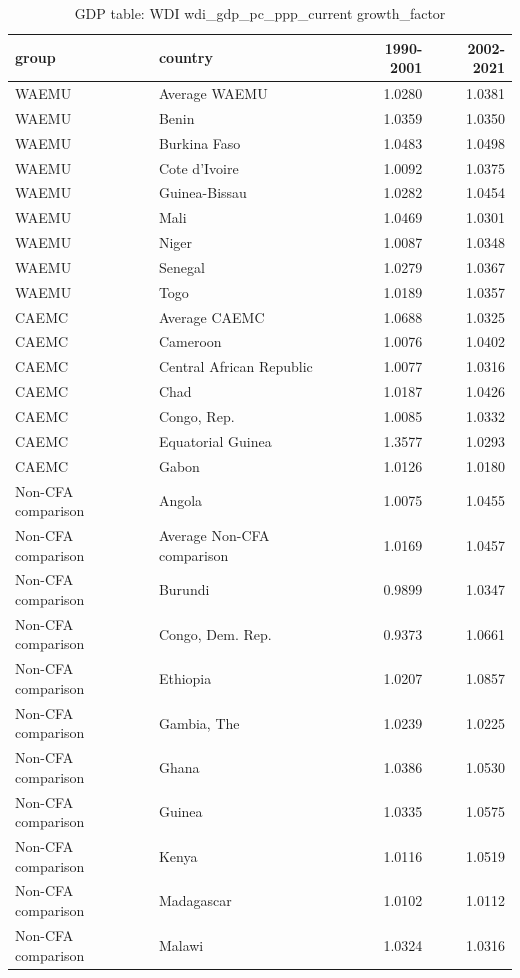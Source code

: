 \begin{table}

\caption{GDP table: WDI wdi_gdp_pc_ppp_current growth_factor}
\centering
\begin{tabular}[t]{llrr}
\toprule
group & country & 1990-2001 & 2002-2021\\
\midrule
WAEMU & Average WAEMU & 1.0280 & 1.0381\\
WAEMU & Benin & 1.0359 & 1.0350\\
WAEMU & Burkina Faso & 1.0483 & 1.0498\\
WAEMU & Cote d'Ivoire & 1.0092 & 1.0375\\
WAEMU & Guinea-Bissau & 1.0282 & 1.0454\\
\addlinespace
WAEMU & Mali & 1.0469 & 1.0301\\
WAEMU & Niger & 1.0087 & 1.0348\\
WAEMU & Senegal & 1.0279 & 1.0367\\
WAEMU & Togo & 1.0189 & 1.0357\\
CAEMC & Average CAEMC & 1.0688 & 1.0325\\
\addlinespace
CAEMC & Cameroon & 1.0076 & 1.0402\\
CAEMC & Central African Republic & 1.0077 & 1.0316\\
CAEMC & Chad & 1.0187 & 1.0426\\
CAEMC & Congo, Rep. & 1.0085 & 1.0332\\
CAEMC & Equatorial Guinea & 1.3577 & 1.0293\\
\addlinespace
CAEMC & Gabon & 1.0126 & 1.0180\\
Non-CFA comparison & Angola & 1.0075 & 1.0455\\
Non-CFA comparison & Average Non-CFA comparison & 1.0169 & 1.0457\\
Non-CFA comparison & Burundi & 0.9899 & 1.0347\\
Non-CFA comparison & Congo, Dem. Rep. & 0.9373 & 1.0661\\
\addlinespace
Non-CFA comparison & Ethiopia & 1.0207 & 1.0857\\
Non-CFA comparison & Gambia, The & 1.0239 & 1.0225\\
Non-CFA comparison & Ghana & 1.0386 & 1.0530\\
Non-CFA comparison & Guinea & 1.0335 & 1.0575\\
Non-CFA comparison & Kenya & 1.0116 & 1.0519\\
\addlinespace
Non-CFA comparison & Madagascar & 1.0102 & 1.0112\\
Non-CFA comparison & Malawi & 1.0324 & 1.0316\\

\end{tabular}
\end{table}
